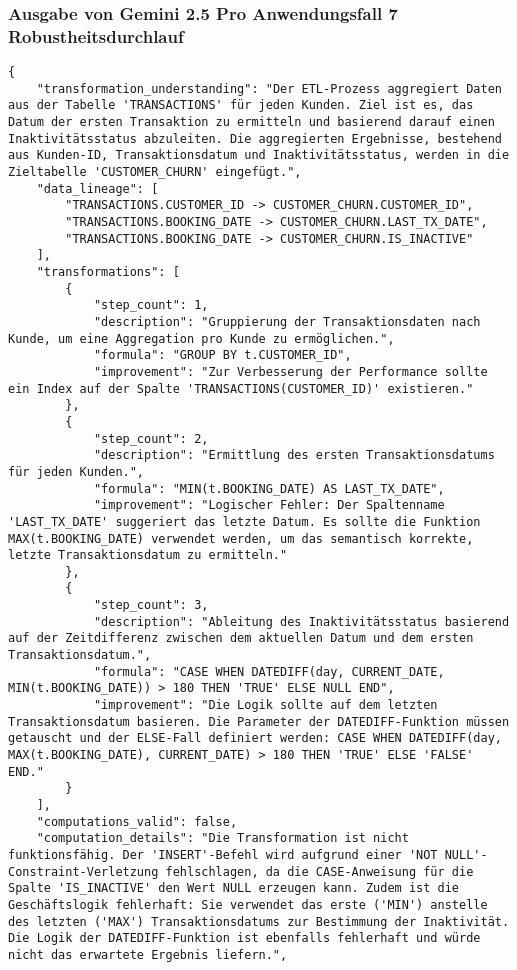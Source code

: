 \subsubsection{Ausgabe von Gemini 2.5 Pro Anwendungsfall 7 Robustheitsdurchlauf}\label{anhang:subsubsec:gemini_case7_prompt3}
\begin{lstlisting}[caption={Ausgabe: Gemini 2.5 Pro Anwendungsfall 7 Robustheitsdurchlauf},label={gemini_case7_prompt3}]
{
    "transformation_understanding": "Der ETL-Prozess aggregiert Daten aus der Tabelle 'TRANSACTIONS' für jeden Kunden. Ziel ist es, das Datum der ersten Transaktion zu ermitteln und basierend darauf einen Inaktivitätsstatus abzuleiten. Die aggregierten Ergebnisse, bestehend aus Kunden-ID, Transaktionsdatum und Inaktivitätsstatus, werden in die Zieltabelle 'CUSTOMER_CHURN' eingefügt.",
    "data_lineage": [
        "TRANSACTIONS.CUSTOMER_ID -> CUSTOMER_CHURN.CUSTOMER_ID",
        "TRANSACTIONS.BOOKING_DATE -> CUSTOMER_CHURN.LAST_TX_DATE",
        "TRANSACTIONS.BOOKING_DATE -> CUSTOMER_CHURN.IS_INACTIVE"
    ],
    "transformations": [
        {
            "step_count": 1,
            "description": "Gruppierung der Transaktionsdaten nach Kunde, um eine Aggregation pro Kunde zu ermöglichen.",
            "formula": "GROUP BY t.CUSTOMER_ID",
            "improvement": "Zur Verbesserung der Performance sollte ein Index auf der Spalte 'TRANSACTIONS(CUSTOMER_ID)' existieren."
        },
        {
            "step_count": 2,
            "description": "Ermittlung des ersten Transaktionsdatums für jeden Kunden.",
            "formula": "MIN(t.BOOKING_DATE) AS LAST_TX_DATE",
            "improvement": "Logischer Fehler: Der Spaltenname 'LAST_TX_DATE' suggeriert das letzte Datum. Es sollte die Funktion MAX(t.BOOKING_DATE) verwendet werden, um das semantisch korrekte, letzte Transaktionsdatum zu ermitteln."
        },
        {
            "step_count": 3,
            "description": "Ableitung des Inaktivitätsstatus basierend auf der Zeitdifferenz zwischen dem aktuellen Datum und dem ersten Transaktionsdatum.",
            "formula": "CASE WHEN DATEDIFF(day, CURRENT_DATE, MIN(t.BOOKING_DATE)) > 180 THEN 'TRUE' ELSE NULL END",
            "improvement": "Die Logik sollte auf dem letzten Transaktionsdatum basieren. Die Parameter der DATEDIFF-Funktion müssen getauscht und der ELSE-Fall definiert werden: CASE WHEN DATEDIFF(day, MAX(t.BOOKING_DATE), CURRENT_DATE) > 180 THEN 'TRUE' ELSE 'FALSE' END."
        }
    ],
    "computations_valid": false,
    "computation_details": "Die Transformation ist nicht funktionsfähig. Der 'INSERT'-Befehl wird aufgrund einer 'NOT NULL'-Constraint-Verletzung fehlschlagen, da die CASE-Anweisung für die Spalte 'IS_INACTIVE' den Wert NULL erzeugen kann. Zudem ist die Geschäftslogik fehlerhaft: Sie verwendet das erste ('MIN') anstelle des letzten ('MAX') Transaktionsdatums zur Bestimmung der Inaktivität. Die Logik der DATEDIFF-Funktion ist ebenfalls fehlerhaft und würde nicht das erwartete Ergebnis liefern.",

\end{lstlisting}
